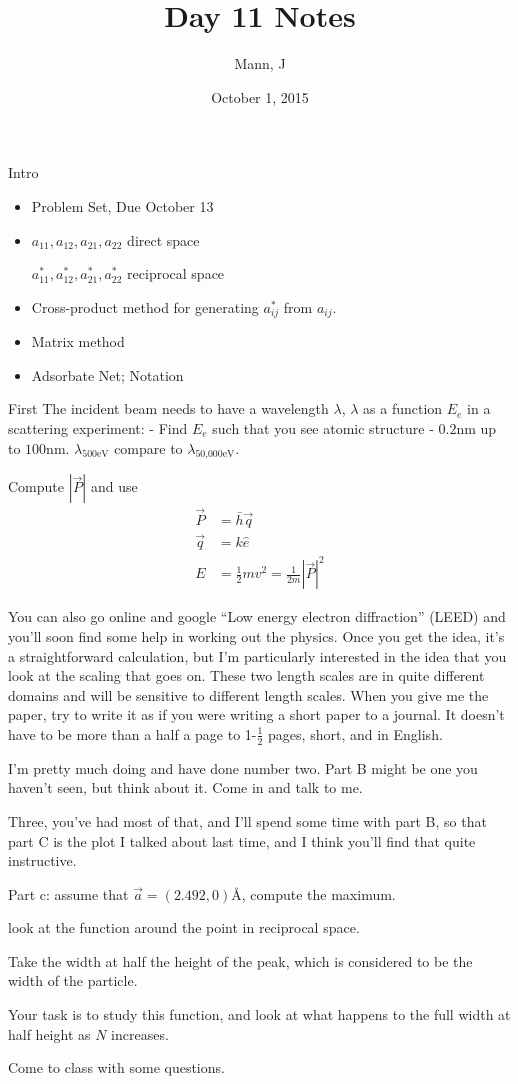 \documentclass{article}
\author{Mann, J}
\title{Day 11 Notes}
\date{October 1, 2015}
\newcommand{\qvec}[0]{\vec{q}}
\newcommand{\norm}[1]{\left|#1\right|}
\begin{document}
\maketitle{}
\begin{section}{Intro}
	\begin{itemize}
		\item Problem Set, Due October 13
		\item $a_{11},a_{12},a_{21},a_{22}$ direct space

					$a_{11}^\ast,a_{12}^\ast,a_{21}^\ast,a_{22}^\ast$ reciprocal space
		\item Cross-product method for generating $a_{ij}^\ast$ from $a_{ij}$.
		\item Matrix method
		\item Adsorbate Net; Notation
	\end{itemize}
\end{section}
\begin{section}{First}
	The incident beam needs to have a wavelength $\lambda$, $\lambda$ as a function $E_e$ in a scattering experiment: - Find $E_e$ such that you see atomic structure - 
	$0.2$nm up to $100$nm.
	$\lambda_\text{500eV}$ compare to $\lambda_\text{50,000eV}$.

	Compute $\norm{\vec{P}}$ and use 
	\begin{align*}
		\vec{P} &= \bar{h}\qvec\\
		\qvec &=k\hat{e}\\
		E &= \frac{1}{2}mv^2 = \frac{1}{2m}\norm{\vec{P}}^2
	\end{align*}

	You can also go online and google ``Low energy electron diffraction'' (LEED) and you'll soon find some help in working out the physics. Once you get the idea, it's a straightforward calculation, but I'm particularly interested in the idea that you look at the scaling that goes on. These two length scales are in quite different domains and will be sensitive to different length scales. When you give me the paper, try to write it as if you were writing a short paper to a journal. It doesn't have to be more than a half a page to 1-$\frac{1}{2}$ pages, short, and in English. 

I'm pretty much doing and have done number two. Part B might be one you haven't seen, but think about it. Come in and talk to me.

Three, you've had most of that, and I'll spend some time with part B, so that part C is the plot I talked about last time, and I think you'll find that quite instructive.

Part c: assume that $\vec{a}=(2.492,0)$\AA, compute the maximum.

look at the function around the point in reciprocal space.

Take the width at half the height of the peak, which is considered to be the width of the particle. 

Your task is to study this function, and look at what happens to the full width at half height as $N$ increases. 

Come to class with some questions.
\end{section}
\end{document}
